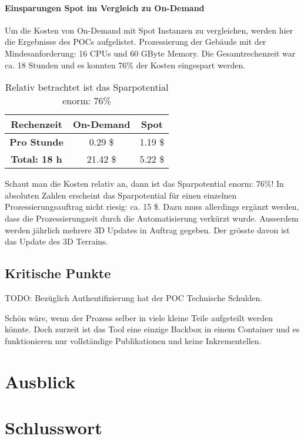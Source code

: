 \paragraph{Einsparungen Spot im Vergleich zu On-Demand}
Um die Kosten von On-Demand mit Spot Instanzen zu vergleichen, werden hier die Ergebnisse des POCs aufgelistet. Prozessierung der Gebäude mit der Mindesanforderung: 16 CPUs und 60 GByte Memory. Die Gesamtrechenzeit war ca. 18 Stunden und es konnten 76\% der Kosten eingespart werden.

\begin{table}[!htbp]
\begin{center}
\begin{tabular}{| c | c | c |}
    \hline
	\textbf{Rechenzeit} & \textbf{On-Demand} & \textbf{Spot}\\
	\hline
	 \textbf{Pro Stunde} & 0.29 \$ & 1.19 \$\\
	\hline
	 \textbf{Total: 18 h} & 21.42 \$ & 5.22 \$\\
	\hline
\end{tabular}
\caption{\label{tab:price_difference}Relativ betrachtet ist das Sparpotential enorm: 76\%}
\end{center}
\end{table}

Schaut man die Kosten relativ an, dann ist das Sparpotential enorm: 76\%! In absoluten Zahlen erscheint das Sparpotential für einen einzelnen Prozessierungsauftrag nicht riesig: ca. 15 \$. Dazu muss allerdings ergänzt werden, dass die Prozessierungzeit durch die Automatisierung verkürzt wurde. Ausserdem werden jährlich mehrere 3D Updates in Auftrag gegeben. Der grösste davon ist das Update des 3D Terrains.

\subsection{Kritische Punkte}
TODO: 
Bezüglich Authentifizierung hat der POC Technische Schulden.

Schön wäre, wenn der Prozess selber in viele kleine Teile aufgeteilt werden könnte. Doch zurzeit ist das Tool eine einzige Backbox in einem Container und es funktionieren nur vollständige Publikationen und keine Inkrementellen. 


\section{Ausblick}

\section{Schlusswort}
